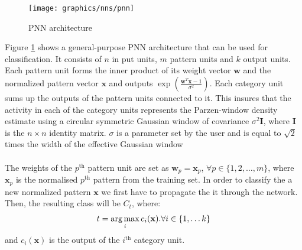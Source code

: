   	\begin{figure}[H]
 		\centering
 		\texttt{[image: graphics/nns/pnn]}
 		\caption{PNN architecture}
 		\label{Fig 2.8}
 	\end{figure}
	 
	 Figure \ref{Fig 2.8} shows a general-purpose PNN architecture that can be used for classification. It consists of $n$ in put units, $m$ pattern units and $k$ output units. Each pattern unit forms the inner product of its weight vector $\mathbf{w}$ and the normalized pattern vector $\mathbf{x}$ and outputs $\exp(\frac{\mathbf{w}^T\mathbf{x} - 1}{\sigma^2})$. Each category unit sums up the outputs of the pattern units connected to it. This insures that the activity in each of the category units represents the Parzen-window density estimate using a circular symmetric Gaussian window of covariance $\sigma^2\mathbf{I}$, where $\mathbf{I}$ is the $n\times n$ identity matrix. $\sigma$ is a parameter set by the user and is equal to $\sqrt{2}$ times the width of the effective Gaussian window
     \\ \\ 
	 The weights of the $p^\text{th}$ pattern unit are set as $\mathbf{w}_p = \mathbf{x}_p$, $\forall p \in \{ 1,2,\dots ,m \}$, where $\mathbf{x}_p$ is the normalised $p^\text{th}$ pattern from the training set. In order to classify the a new normalized pattern $\mathbf{x}$ we first have to propagate the it through the network. Then, the resulting class will be $C_t$, where:
	 \begin{equation}
		 t = \operatorname*{arg\,max}_i c_i(\mathbf{x}). \forall i \in \{1,\dots k\}
	 \end{equation}
	 and $c_i(\mathbf{x})$ is the output of the $i^\text{th}$ category unit.
